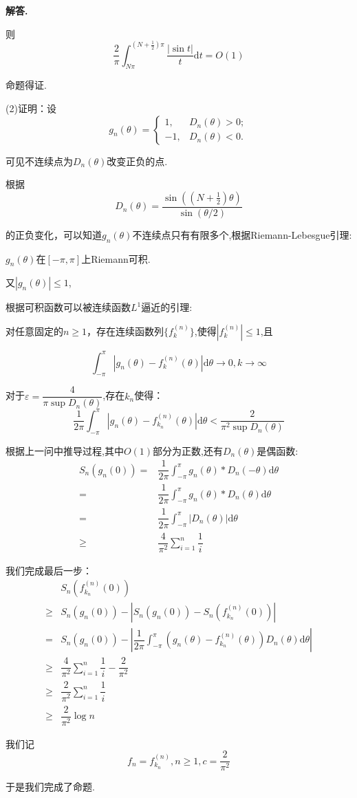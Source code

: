 \documentclass[12pt, a4paper, oneside]{ctexart}
\newenvironment{solution}{\par\noindent\textbf{解答. }}{\par}
\begin{document}
\begin{solution}
$$$$
\par
则
$$
\dfrac{2}{\pi}\int_{N\pi}^{(N+\frac{1}{2})\pi}\dfrac{|\sin t|}{t}\mathrm{d}t=O(1)
$$
\par
命题得证.
\par
(2)证明：设$$
g_n(\theta)=
\begin{cases}
1, &D_n(\theta)>0;\\
-1, &D_n(\theta)<0.
\end{cases}
$$
\par
可见不连续点为$D_n(\theta)$改变正负的点.
\par
根据
$$
D_n(\theta)=\dfrac{\sin((N+\frac{1}{2})\theta)}{\sin (\theta/2)}
$$
\par
的正负变化，可以知道$g_n(\theta)$不连续点只有有限多个,根据Riemann-Lebesgue引理:
\par
 $g_n(\theta)$在$[-\pi,\pi]$上Riemann可积.
\par
又$|g_n(\theta)|\leqslant 1$,
\
\par
根据可积函数可以被连续函数$L^1$逼近的引理:
\par
对任意固定的$n \geqslant 1$，存在连续函数列$\{f_k^{(n)}\}$,使得$|f_k^{(n)}|\leqslant 1$,且
\par
$$
\int_{-\pi}^{\pi}|g_n(\theta)-f_k^{(n)}(\theta)|\mathrm{d}\theta \to 0, k \to \infty
$$
\par
对于$\varepsilon=\dfrac{4}{\pi \sup{D_n(\theta)}}$,存在$k_n$使得：
$$
\dfrac{1}{2\pi}\int_{-\pi}^{\pi}|g_n(\theta)-f_{k_n}^{(n)}(\theta)|\mathrm{d}\theta
 <\dfrac{2}{\pi^2\sup{D_n(\theta)}}
$$
\par
根据上一问中推导过程,其中$O(1)$部分为正数,还有$D_n(\theta)$是偶函数:
$$
\begin{aligned}
S_n(g_n(0))=&\dfrac{1}{2\pi}\int_{-\pi}^{\pi}g_n(\theta)*D_n(-\theta)\mathrm{d}\theta\\
=&\dfrac{1}{2\pi}\int_{-\pi}^{\pi}g_n(\theta)*D_n(\theta)\mathrm{d}\theta\\
=&\dfrac{1}{2\pi}\int_{-\pi}^{\pi}|D_n(\theta)|\mathrm{d}\theta\\
\geqslant& \dfrac{4}{\pi^2}\sum_{i=1}^{n}\dfrac{1}{i}
\end{aligned}
$$
\par
我们完成最后一步：
$$
\begin{aligned}
&S_n\left(f_{k_n}^{(n)}(0)\right)\\
\geqslant &S_n(g_n(0))-\left|S_n(g_n(0))-S_n(f_{k_n}^{(n)}(0))\right|\\
=&S_n(g_n(0))-\left|\dfrac{1}{2\pi}\int_{-\pi}^{\pi}
(g_n(\theta)-f_{k_n}^{(n)}(\theta))D_n(\theta)\mathrm{d}\theta\right|\\
\geqslant &\dfrac{4}{\pi^2}\sum_{i=1}^{n}\dfrac{1}{i}-\dfrac{2}{\pi^2}\\
\geqslant &\dfrac{2}{\pi^2}\sum_{i=1}^{n}\dfrac{1}{i}\\
\geqslant & \dfrac{2}{\pi^2}\log n
\end{aligned}
$$
\par
我们记$$
f_n=f_{k_n}^{(n)}, n\geqslant 1, c=\dfrac{2}{\pi^2}
$$
\par
于是我们完成了命题.
\end{solution}
\end{document}
